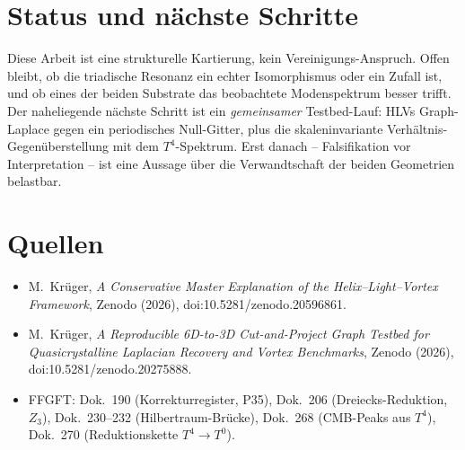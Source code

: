 \section{Status und nächste Schritte}

Diese Arbeit ist eine strukturelle Kartierung, kein Vereinigungs-Anspruch. Offen bleibt, ob die
triadische Resonanz ein echter Isomorphismus oder ein Zufall ist, und ob eines der beiden Substrate
das beobachtete Modenspektrum besser trifft. Der naheliegende nächste Schritt ist ein \emph{gemeinsamer}
Testbed-Lauf: HLVs Graph-Laplace gegen ein periodisches Null-Gitter, plus die skaleninvariante
Verhältnis-Gegenüberstellung mit dem $T^4$-Spektrum. Erst danach -- Falsifikation vor Interpretation --
ist eine Aussage über die Verwandtschaft der beiden Geometrien belastbar.

\section{Quellen}

\begin{itemize}
\item M.~Krüger, \emph{A Conservative Master Explanation of the Helix--Light--Vortex Framework},
Zenodo (2026), doi:10.5281/zenodo.20596861.
\item M.~Krüger, \emph{A Reproducible 6D-to-3D Cut-and-Project Graph Testbed for Quasicrystalline
Laplacian Recovery and Vortex Benchmarks}, Zenodo (2026), doi:10.5281/zenodo.20275888.
\item FFGFT: Dok.~190 (Korrekturregister, P35), Dok.~206 (Dreiecks-Reduktion, $Z_3$), Dok.~230--232
(Hilbertraum-Brücke), Dok.~268 (CMB-Peaks aus $T^4$), Dok.~270 (Reduktionskette $T^4\!\to\!T^0$).
\end{itemize}
